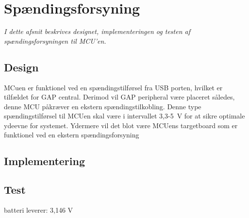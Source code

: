 \section{Spændingsforsyning}
\textit{I dette afsnit beskrives designet, implementeringen og testen af spændingsforsyningen til MCU'en.}

\subsection{Design}
MCuen er funktionel ved en spændingstilførsel fra USB porten, hvilket er tilfældet for GAP central. Derimod vil GAP peripheral være placeret således, denne MCU påkræver en ekstern spændingstilkobling. Denne type spændingstilførsel til MCUen skal være i intervallet 3,3-5~V for at sikre optimale ydeevne for systemet. Ydermere vil det blot være MCUens targetboard som er funktionel ved en ekstern spændingsforsyning \newline



\subsection{Implementering}
\subsection{Test} 

batteri leverer: 3,146 V


